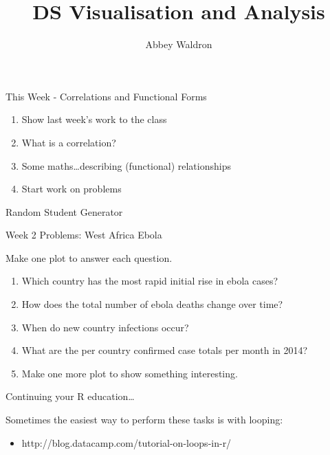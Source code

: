 \documentclass{beamer}
\newif\ifplacelogo
\begin{document}
\setlength{\unitlength}{1mm}
\title{DS Visualisation and Analysis}
\author[Abbey Waldron]{Abbey Waldron}
\date[September 18th, 2015]{}





{
\placelogofalse
\begin{frame}
  \titlepage
\end{frame}
}



\begin{frame}{This Week - Correlations and Functional Forms}

\begin{enumerate}
\item Show last week's work to the class
\item What is a correlation?
\item Some maths\ldots describing (functional) relationships
\item Start work on problems
\end{enumerate}

\end{frame}



\begin{frame}{Random Student Generator}

\end{frame}


\begin{frame}{Week 2 Problems: West Africa Ebola}

Make one plot to answer each question.

\begin{enumerate}
\item Which country has the most rapid initial rise in ebola cases?
\item How does the total number of ebola deaths change over time?
\item When do new country infections occur?
\item What are the per country confirmed case totals per month in 2014?
\item Make one more plot to show something interesting.
\end{enumerate}



\end{frame}


\begin{frame}{Continuing your R education\ldots}

Sometimes the easiest way to perform these tasks is with looping:
\begin{itemize}
\item http://blog.datacamp.com/tutorial-on-loops-in-r/
\end{itemize}

\end{frame}
\end{document}
